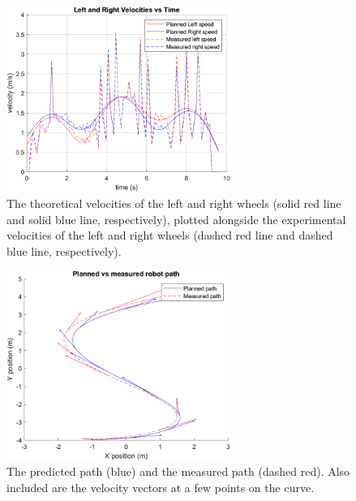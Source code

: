 \begin{figure}[h]
    \centering
    \includegraphics[width=0.65\textwidth]{img/measured_wheelspeeds.png}
    \caption{The theoretical velocities of the left and right wheels (solid red line and solid blue line, respectively), plotted alongside the experimental velocities of the left and right wheels (dashed red line and dashed blue line, respectively).}
    \label{fig:planned_wheelspeed3}
\end{figure}

\begin{figure}[h]
    \centering
    \includegraphics[width=0.65\textwidth]{img/measured_path.png}
    \caption{The predicted path (blue) and the measured path (dashed red). Also included are the velocity vectors at a few points on the curve.}
    \label{fig:planned_wheelspeed4}
\end{figure}



